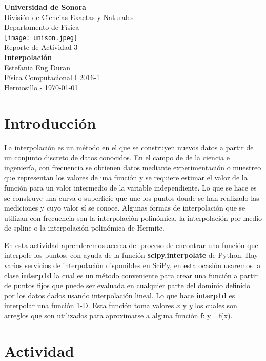 \documentclass[12pt,spanish]{article}
\begin{document}
\begin{center}
  \textbf{\Huge Universidad de Sonora}\\[0.5cm]
  {\LARGE División de Ciencias Exactas y Naturales}\\[0.5cm]
  {\LARGE Departamento de Física}\\[1.25cm]
    \texttt{[image: unison.jpeg]}\\[0.8cm]
     \vfill
  {\Large Reporte de Actividad 3}\\[2.1cm]
  {\Large \textbf{\Huge Interpolación}}\\[3.0cm]
  {\Large Estefania Eng Duran}\\[2.1cm]
  Física Computacional I 2016-1\\[0.5cm]
  Hermosillo - \today
\end{center}

\section*{Introducción}

La interpolación es un método en el que se construyen nuevos datos a partir de un conjunto discreto de datos conocidos. En el campo de de la ciencia e ingeniería, con frecuencia se obtienen datos mediante experimentación o muestreo que representan los valores de una función y se requiere estimar el valor de la función para un valor intermedio de la variable independiente. Lo que se hace es se construye una curva o superficie que une los puntos donde se han realizado las mediciones y cuyo valor sí se conoce. Algunas formas de interpolación que se utilizan con frecuencia son la interpolación polinómica, la interpolación por medio de spline o la interpolación polinómica de Hermite.

En esta actividad aprenderemos acerca del proceso de encontrar una función que interpole los puntos, con ayuda de la función \textbf{scipy.interpolate} de Python. Hay varios servicios de interpolación disponibles en SciPy, en esta ocasión usaremos la clase \textbf{interp1d} la cual es un método conveniente para crear una función a partir de puntos fijos que puede ser evaluada en cualquier parte del dominio definido por los datos dados usando interpolación lineal. Lo que hace \textbf{interp1d} es interpolar una función 1-D. Esta función toma valores $x$ y $y$ los cuales son arreglos que son utilizados para aproximarse a alguna función f: y= f(x).


\bigskip

\section*{Actividad}
\end{document}
